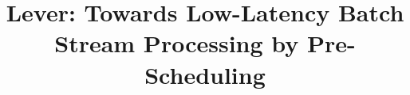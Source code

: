 \documentclass[10pt,conference,compsocconf,letterpaper]{IEEEtran}
\begin{document}
%
\title{Lever: Towards Low-Latency Batch Stream Processing by Pre-Scheduling}




%
\end{document}
